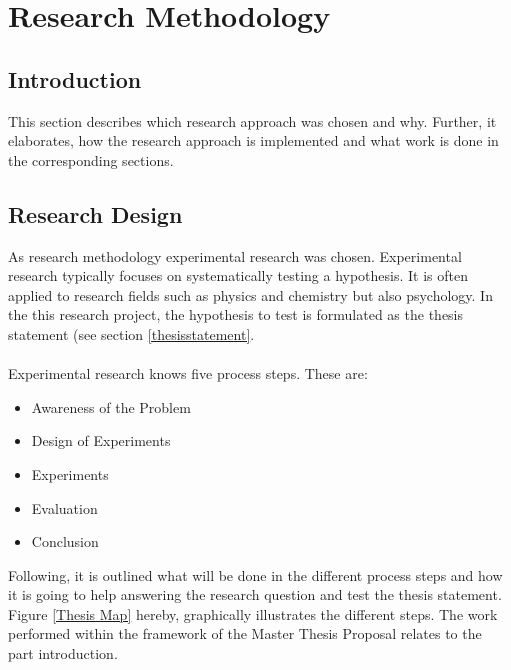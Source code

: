 
\chapter{Research Methodology} %

\section{Introduction}
This section describes which research approach was chosen and why. Further, it elaborates, how the research approach is implemented and what work is done in the corresponding sections. 

\section{Research Design}
As research methodology experimental research was chosen. Experimental research typically focuses on systematically testing a hypothesis. It is often applied to research fields such as physics and chemistry but also psychology. In the this research project, the hypothesis to test is formulated as the thesis statement (see section \ref{thesisstatement}.\\
\\
Experimental research knows five process steps. These are:

\begin{itemize}
	\item Awareness of the Problem
	\item Design of Experiments
	\item Experiments
	\item Evaluation
	\item Conclusion
\end{itemize}

Following, it is outlined what will be done in the different process steps and how it is going to help answering the research question and test the thesis statement. Figure \ref{Thesis Map} hereby, graphically illustrates the different steps. The work performed within the framework of the Master Thesis Proposal relates to the part introduction. 

